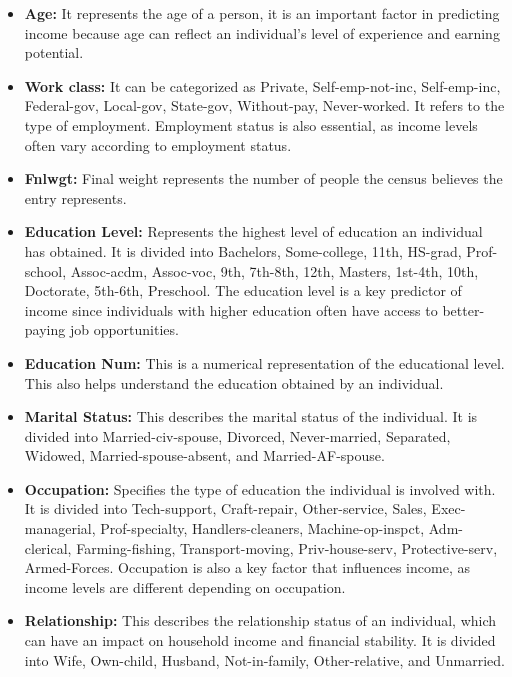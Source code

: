 \documentclass[10pt,journal,compsoc]{IEEEtran}
\begin{document}
\begin{itemize}
    \item \textbf{Age:} It represents the age of a person, it is an important factor in predicting income because age can reflect an individual's level of experience and earning potential.

    \item \textbf{Work class:} It can be categorized as Private, Self-emp-not-inc, Self-emp-inc, Federal-gov, Local-gov, State-gov, Without-pay, Never-worked. It refers to the type of employment. Employment status is also essential, as income levels often vary according to employment status.

    \item \textbf{Fnlwgt:} Final weight represents the number of people the census believes the entry represents.

    \item \textbf{Education Level:} Represents the highest level of education an individual has obtained. It is divided into Bachelors, Some-college, 11th, HS-grad, Prof-school, Assoc-acdm, Assoc-voc, 9th, 7th-8th, 12th, Masters, 1st-4th, 10th, Doctorate, 5th-6th, Preschool. The education level is a key predictor of income since individuals with higher education often have access to better-paying job opportunities.

    \item \textbf{Education Num:} This is a numerical representation of the educational level. This also helps understand the education obtained by an individual.

    \item \textbf{Marital Status:} This describes the marital status of the individual. It is divided into Married-civ-spouse, Divorced, Never-married, Separated, Widowed, Married-spouse-absent, and Married-AF-spouse.

    \item \textbf{Occupation:} Specifies the type of education the individual is involved with. It is divided into Tech-support, Craft-repair, Other-service, Sales, Exec-managerial, Prof-specialty, Handlers-cleaners, Machine-op-inspct, Adm-clerical, Farming-fishing, Transport-moving, Priv-house-serv, Protective-serv, Armed-Forces. Occupation is also a key factor that influences income, as income levels are different depending on occupation.

    \item \textbf{Relationship:} This describes the relationship status of an individual, which can have an impact on household income and financial stability. It is divided into Wife, Own-child, Husband, Not-in-family, Other-relative, and Unmarried.


\end{itemize}
\end{document}
